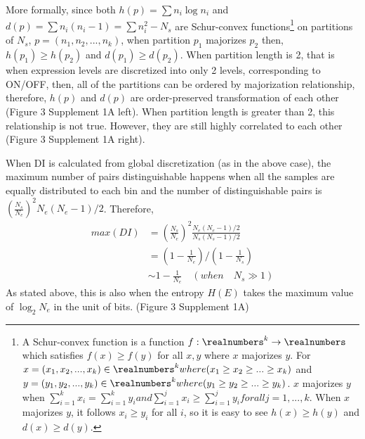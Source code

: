 More formally, since both $h(p) = \sum{n_i\log n_i}$ and $d(p) = \sum n_i(n_i-1) = \sum n_i^2 - N_s$ are Schur-convex functions\footnote{A Schur-convex function is a function $f:\realnumbers^k \rightarrow \realnumbers$ which satisfies $f(x) \geq f(y)$ for all $x,y$ where $x$ majorizes $y$. For $x=(x_1,x_2,...,x_k) \in \realnumbers^k where (x_1 \geq x_2 \geq ... \geq x_k) $ and $y=(y_1,y_2,...,y_k) \in \realnumbers^k where (y_1 \geq y_2 \geq ... \geq y_k)$. $x$ majorizes $y$ when $\sum_{i=1}^{k} x_i = \sum_{i=1}^{k} y_i and \sum_{i=1}^{j} x_i \geq \sum_{i=1}^{j} y_i for all j=1,...,k$. When $x$ majorizes $y$, it follows $x_i \geq y_i$ for all $i$, so it is easy to see $h(x) \geq h(y)$ and $d(x) \geq d(y)$.} on partitions of $N_s$,  $p=(n_1,n_2,...,n_k)$, when partition $p_1$ majorizes $p_2$ then, $h(p_1)\geq h(p_2)$ and $d(p_1)\geq d(p_2)$. When partition length is 2, that is when expression levels are discretized into only 2 levels, corresponding to ON/OFF, then, all of the partitions can be ordered by majorization relationship, therefore, $h(p)$ and $d(p)$ are order-preserved transformation of each other (Figure 3 Supplement 1A left). When partition length is greater than 2, this relationship is not true. However, they are still highly correlated to each other (Figure 3 Supplement 1A right). 

When DI is calculated from global discretization (as in the above case), the maximum number of pairs distinguishable happens when all the samples are equally distributed to each bin and the number of distinguishable pairs is $\left( \frac{N_s}{N_e}\right)^2N_e(N_e-1)/2$. Therefore,
\begin{align}
max(DI) &= \left( \frac{N_s}{N_e}\right)^2 \frac{N_e(N_e-1)/2}{N_s(N_s-1)/2}\\
		&= \left( 1 - \frac{1}{N_e} \right) / \left( 1 - \frac{1}{N_s} \right) \\
        &\sim 1 - \frac{1}{N_e} \quad(when\quad N_s \gg 1)
\end{align}
As stated above, this is also when the entropy $H(E)$ takes the maximum value of $\log_{2} N_e$ in the unit of bits. (Figure 3 Supplement 1A)
